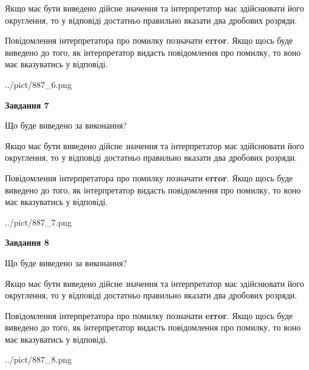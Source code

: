 \documentclass[12pt, ukrainian]{article}
\begin{document}
{\begin {Large}
Якщо має бути виведено дійсне значення та інтерпретатор має здійснювати його округлення, 
то у відповіді достатньо правильно вказати два дробових розряди.

Повідомлення інтерпретатора про помилку позначати \textbf{error}.
Якщо щось буде виведено до того, як інтерпретатор видасть повідомлення про помилку, 
то воно має вказуватись у відповіді. \par

\begin{center}
	{../pict/887_6.png}
\end{center}
\newpage

{\begin {center}\textbf{Завдання 7}\end {center}}\par
Що буде виведено за виконання? \par

Якщо має бути виведено дійсне значення та інтерпретатор має здійснювати його округлення, 
то у відповіді достатньо правильно вказати два дробових розряди.

Повідомлення інтерпретатора про помилку позначати \textbf{error}.
Якщо щось буде виведено до того, як інтерпретатор видасть повідомлення про помилку, 
то воно має вказуватись у відповіді. \par

\begin{center}
	{../pict/887_7.png}
\end{center}
\newpage

{\begin {center}\textbf{Завдання 8}\end {center}}\par
Що буде виведено за виконання? \par

Якщо має бути виведено дійсне значення та інтерпретатор має здійснювати його округлення, 
то у відповіді достатньо правильно вказати два дробових розряди.

Повідомлення інтерпретатора про помилку позначати \textbf{error}.
Якщо щось буде виведено до того, як інтерпретатор видасть повідомлення про помилку, 
то воно має вказуватись у відповіді. \par

\begin{center}
	{../pict/887_8.png}
\end{center}
\newpage


\end{Large}}
\end{document}
